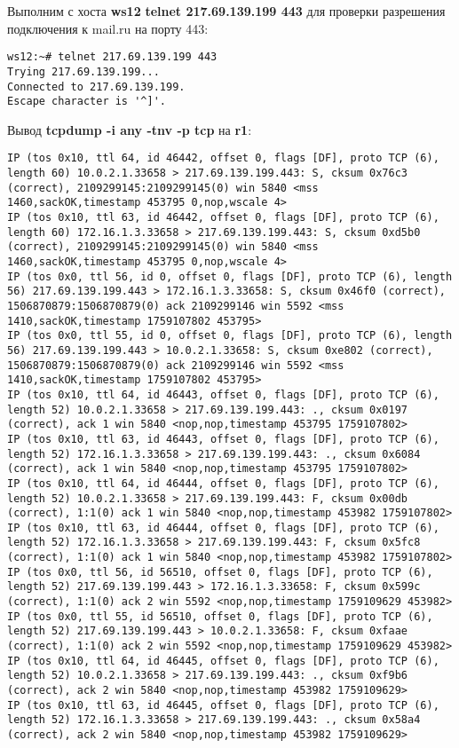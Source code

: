 \documentclass[a4paper,12pt]{article}
\begin{document}
Выполним с хоста \textbf{ws12} \textbf{telnet 217.69.139.199 443} для проверки
разрешения подключения к mail.ru на порту 443:
\begin{Verbatim}
ws12:~# telnet 217.69.139.199 443
Trying 217.69.139.199...
Connected to 217.69.139.199.
Escape character is '^]'.
\end{Verbatim}

Вывод \textbf{tcpdump -i any -tnv -p tcp} на \textbf{r1}:
\begin{Verbatim}
IP (tos 0x10, ttl 64, id 46442, offset 0, flags [DF], proto TCP (6), length 60) 10.0.2.1.33658 > 217.69.139.199.443: S, cksum 0x76c3 (correct), 2109299145:2109299145(0) win 5840 <mss 1460,sackOK,timestamp 453795 0,nop,wscale 4>
IP (tos 0x10, ttl 63, id 46442, offset 0, flags [DF], proto TCP (6), length 60) 172.16.1.3.33658 > 217.69.139.199.443: S, cksum 0xd5b0 (correct), 2109299145:2109299145(0) win 5840 <mss 1460,sackOK,timestamp 453795 0,nop,wscale 4>
IP (tos 0x0, ttl 56, id 0, offset 0, flags [DF], proto TCP (6), length 56) 217.69.139.199.443 > 172.16.1.3.33658: S, cksum 0x46f0 (correct), 1506870879:1506870879(0) ack 2109299146 win 5592 <mss 1410,sackOK,timestamp 1759107802 453795>
IP (tos 0x0, ttl 55, id 0, offset 0, flags [DF], proto TCP (6), length 56) 217.69.139.199.443 > 10.0.2.1.33658: S, cksum 0xe802 (correct), 1506870879:1506870879(0) ack 2109299146 win 5592 <mss 1410,sackOK,timestamp 1759107802 453795>
IP (tos 0x10, ttl 64, id 46443, offset 0, flags [DF], proto TCP (6), length 52) 10.0.2.1.33658 > 217.69.139.199.443: ., cksum 0x0197 (correct), ack 1 win 5840 <nop,nop,timestamp 453795 1759107802>
IP (tos 0x10, ttl 63, id 46443, offset 0, flags [DF], proto TCP (6), length 52) 172.16.1.3.33658 > 217.69.139.199.443: ., cksum 0x6084 (correct), ack 1 win 5840 <nop,nop,timestamp 453795 1759107802>
IP (tos 0x10, ttl 64, id 46444, offset 0, flags [DF], proto TCP (6), length 52) 10.0.2.1.33658 > 217.69.139.199.443: F, cksum 0x00db (correct), 1:1(0) ack 1 win 5840 <nop,nop,timestamp 453982 1759107802>
IP (tos 0x10, ttl 63, id 46444, offset 0, flags [DF], proto TCP (6), length 52) 172.16.1.3.33658 > 217.69.139.199.443: F, cksum 0x5fc8 (correct), 1:1(0) ack 1 win 5840 <nop,nop,timestamp 453982 1759107802>
IP (tos 0x0, ttl 56, id 56510, offset 0, flags [DF], proto TCP (6), length 52) 217.69.139.199.443 > 172.16.1.3.33658: F, cksum 0x599c (correct), 1:1(0) ack 2 win 5592 <nop,nop,timestamp 1759109629 453982>
IP (tos 0x0, ttl 55, id 56510, offset 0, flags [DF], proto TCP (6), length 52) 217.69.139.199.443 > 10.0.2.1.33658: F, cksum 0xfaae (correct), 1:1(0) ack 2 win 5592 <nop,nop,timestamp 1759109629 453982>
IP (tos 0x10, ttl 64, id 46445, offset 0, flags [DF], proto TCP (6), length 52) 10.0.2.1.33658 > 217.69.139.199.443: ., cksum 0xf9b6 (correct), ack 2 win 5840 <nop,nop,timestamp 453982 1759109629>
IP (tos 0x10, ttl 63, id 46445, offset 0, flags [DF], proto TCP (6), length 52) 172.16.1.3.33658 > 217.69.139.199.443: ., cksum 0x58a4 (correct), ack 2 win 5840 <nop,nop,timestamp 453982 1759109629>
\end{Verbatim}
\end{document}
